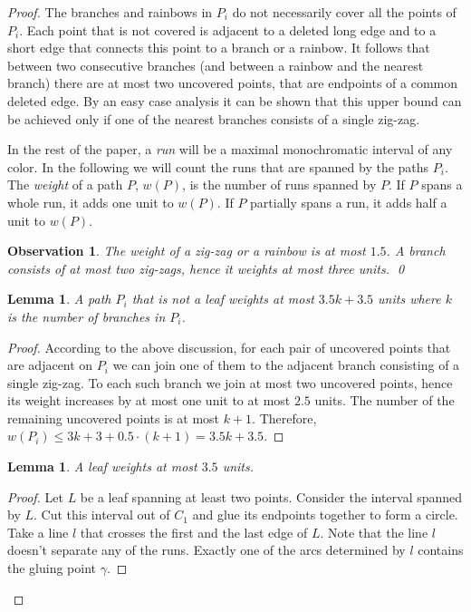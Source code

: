 \documentclass[12pt]{article}
\newtheorem{lemma}[theorem]{Lemma}
\newtheorem{obs}[theorem]{Observation}
\begin{document}
\begin{proof}
The branches and rainbows in $P_i$ do not necessarily cover all the points of $P_i$. Each point that is not covered is adjacent to a deleted long edge and to a short edge that connects this point to a branch or a rainbow. It follows that between two consecutive branches (and between a rainbow and the nearest branch) there are at most two uncovered points, that are endpoints of a common deleted edge. By an easy case analysis it can be shown that this upper bound can be achieved only if one of the nearest branches consists of a single zig-zag.

In the rest of the paper, a {\em run\/} will be a maximal monochromatic interval of any color.
In the following we will count the runs that are spanned by the paths $P_i$. The {\em weight\/} of a path $P$, $w(P)$, is the number of runs spanned by $P$. If $P$ spans a whole run, it adds one unit to $w(P)$. If $P$ partially spans a run, it adds half a unit to $w(P)$.

\begin{obs}\label{o:mbranch}
The weight of a zig-zag or a rainbow is at most $1.5$. A branch consists of at most two zig-zags, hence it weights at most three units. \qed
\end{obs}

 
\begin{lemma} \label{l:path}
A path $P_i$ that is not a leaf weights at most $3.5k+3.5$ units where $k$ is the number of branches in $P_i$.
\end{lemma}

\begin{proof}
According to the above discussion, for each pair of uncovered points that are adjacent on $P_i$ we can join one of them to the adjacent branch consisting of a single zig-zag. To each such branch we join at most two uncovered points, hence its weight increases by at most one unit to at most $2.5$ units. The number of the remaining uncovered points is at most $k+1$. Therefore, $w(P_i) \le 3k + 3 + 0.5 \cdot (k+1) = 3.5k+3.5$.
\end{proof}


\begin{lemma}\label{l:leaf}
A leaf weights at most $3.5$ units.
\end{lemma}



\begin{proof}
Let $L$ be a leaf spanning at least two points. Consider the interval spanned by $L$. Cut this interval out of $C_1$ and glue its endpoints together to form a circle. Take a line $l$ that crosses the first and the last edge of $L$. Note that the line $l$ doesn't separate any of the runs. Exactly one of the arcs determined by $l$ contains the gluing point $\gamma$. 


\end{proof}
\end{proof}
\end{document}
